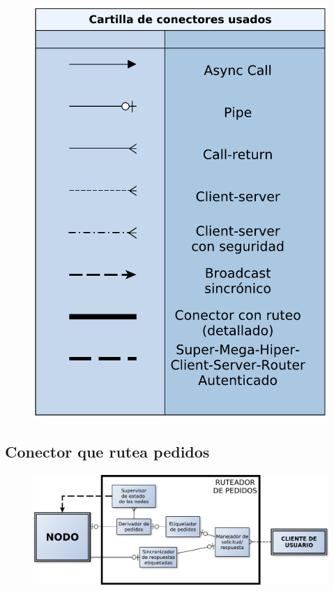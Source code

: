 \begin{figure}[H]
\centering
\includegraphics{graph/cartilla.pdf}
\end{figure}


\subsection{Conector que rutea pedidos}

\begin{figure}[H]
\centering
\includegraphics[width=\textwidth]{graph/conector.pdf}
\end{figure}

